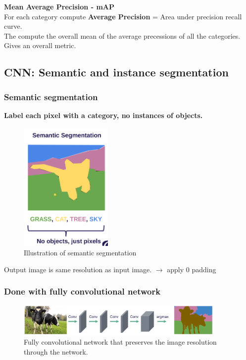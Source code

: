 \documentclass[a4paper]{article}
\begin{document}
\textbf{Mean Average Precision - mAP} \\
For each category compute \textbf{Average Precision} = Area under precision recall curve. \\
The compute the overall mean of the average precessions of all the categories. Gives an overall metric.



\newpage
\subsection{CNN: Semantic and instance segmentation}
\subsubsection{Semantic segmentation}
\textbf{Label each pixel with a category, no instances of objects.} 
\begin{figure}[H]
\centering
\includegraphics[width=0.4\textwidth]{figures/Semantic_segmentation.png}
\caption{Illustration of semantic segmentation}
\label{fig:semantic_segmentation}
\end{figure} 

Output image is same resolution as input image. $ \rightarrow $ apply 0 padding \\

\subsubsection*{Done with fully convolutional network}
\begin{figure}[H]
\centering
\includegraphics[width=0.9\textwidth]{figures/Fully_convolutional_network_SS.png}
\caption{Fully convolutional network that preserves the image resolution through the network.}
\label{fig:fully_convolutional_network}
\end{figure} 
\end{document}
